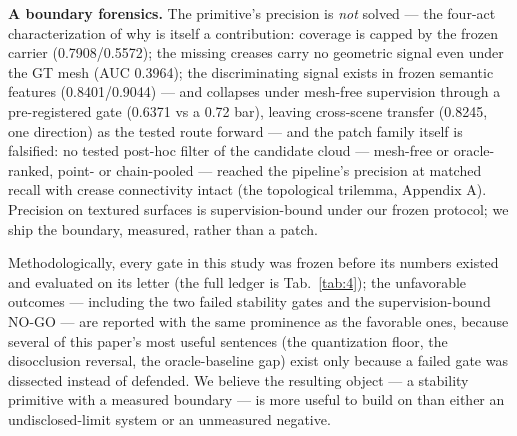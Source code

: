 \textbf{A boundary forensics.} The primitive's precision is \emph{not} solved --- the four-act
characterization of why is itself a contribution: coverage is capped by the frozen carrier
(0.7908/0.5572); the missing creases carry no geometric signal even under the GT mesh
(AUC 0.3964); the discriminating signal exists in frozen semantic features (0.8401/0.9044)
--- and collapses under mesh-free supervision through a pre-registered gate (0.6371 vs a
0.72 bar), leaving cross-scene transfer (0.8245, one direction) as the tested route
forward --- and the patch family itself is falsified: no tested post-hoc filter of the candidate
cloud --- mesh-free or oracle-ranked, point- or chain-pooled --- reached the pipeline's
precision at matched recall with crease connectivity intact (the topological trilemma,
Appendix A). Precision on textured surfaces is supervision-bound under our frozen
protocol; we ship the boundary, measured, rather than a patch.

Methodologically, every gate in this study was frozen before its numbers existed and
evaluated on its letter (the full ledger is Tab.~\ref{tab:4}); the unfavorable outcomes --- including the two failed stability
gates and the supervision-bound NO-GO --- are reported with the same prominence as the
favorable ones, because several of this paper's most useful sentences (the quantization
floor, the disocclusion reversal, the oracle-baseline gap) exist only because a failed
gate was dissected instead of defended. We believe the resulting object --- a stability
primitive with a measured boundary --- is more useful to build on than either an
undisclosed-limit system or an unmeasured negative.

